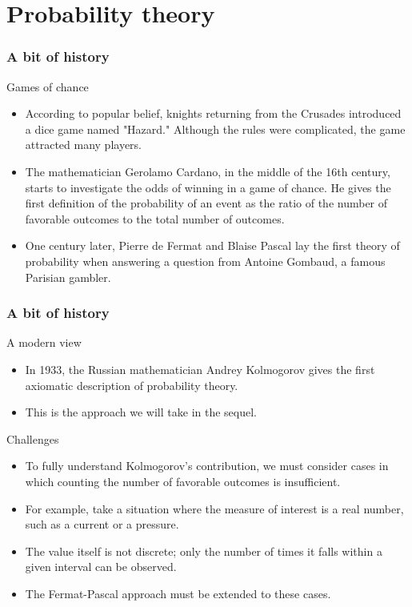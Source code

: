 \section{Probability theory}

\begin{frame}
    \frametitle{A bit of history}
\begin{block}{Games of chance}
    \begin{itemize}
        \item<+-> According to popular belief, knights returning from the Crusades introduced a dice game named "Hazard."
         Although the rules were complicated, the game attracted many players.
        \item<+-> The mathematician Gerolamo Cardano, in the middle of the 16th century, starts to investigate the odds of winning
        in a game of chance. He gives the first definition of the probability of an event as the ratio of
        the number of favorable outcomes to the total number of outcomes.
        \item<+-> One century later, Pierre de Fermat and Blaise Pascal lay the first theory of probability when
        answering a question from Antoine Gombaud, a famous Parisian gambler.
    \end{itemize}
\end{block}
\end{frame}
\begin{frame}
    \frametitle{A bit of history}
\begin{block}{A modern view}
    \begin{itemize}
        \item<+-> In 1933, the Russian mathematician Andrey Kolmogorov gives the first axiomatic description of probability theory.
        \item<+-> This is the approach we will take in the sequel.
    \end{itemize}
\end{block}    
\begin{block}{Challenges}
    \begin{itemize}
       \item<+-> To fully understand Kolmogorov's contribution, we must consider cases in which counting the number of favorable outcomes is insufficient.
       \item<+-> For example, take a situation where the measure of interest is a real number, such as a current or a pressure.
       \item<+-> The value itself is not discrete; only the number of times it falls within a given interval can be observed.
       \item<+-> The Fermat-Pascal approach must be extended to these cases.
    \end{itemize}
\end{block}    
\end{frame}
